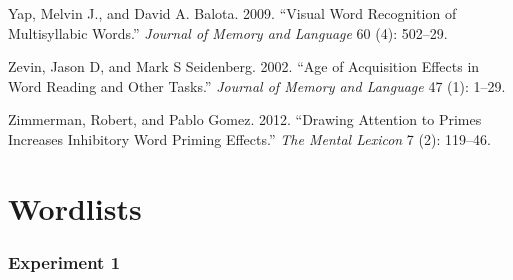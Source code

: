 \documentclass[
]{interact}
\newlength{\cslhangindent}
\newenvironment{CSLReferences}[2] %
 {\begin{list}{}{%
  \setlength{\itemindent}{0pt}
  \setlength{\leftmargin}{0pt}
  \setlength{\parsep}{0pt}
  \ifodd #1
   \setlength{\leftmargin}{\cslhangindent}
   \setlength{\itemindent}{-1\cslhangindent}
  \fi
  \setlength{\itemsep}{#2\baselineskip}}}
 {\end{list}}
\begin{document}
\begin{CSLReferences}{1}{0}
Yap, Melvin J., and David A. Balota. 2009. {``Visual Word Recognition of
Multisyllabic Words.''} \emph{Journal of Memory and Language} 60 (4):
502--29.

Zevin, Jason D, and Mark S Seidenberg. 2002. {``Age of Acquisition
Effects in Word Reading and Other Tasks.''} \emph{Journal of Memory and
Language} 47 (1): 1--29.

Zimmerman, Robert, and Pablo Gomez. 2012. {``Drawing Attention to Primes
Increases Inhibitory Word Priming Effects.''} \emph{The Mental Lexicon}
7 (2): 119--46.

\end{CSLReferences}

\section*{Wordlists}\label{wordlists}

\subsubsection*{Experiment 1}\label{experiment-1}
\end{document}
